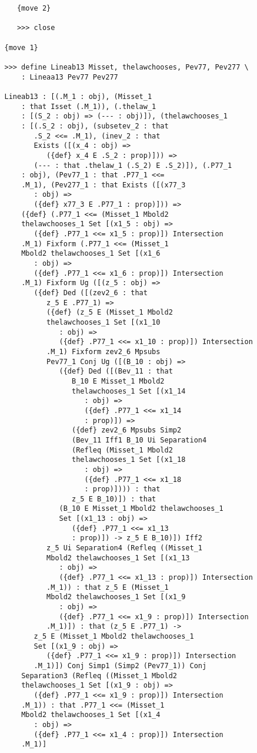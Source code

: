 \documentclass[12pt]{article}
\begin{document}
\begin{verbatim}
      {move 2}

      >>> close

   {move 1}

   >>> define Lineab13 Misset, thelawchooses, Pev77, Pev277 \
       : Lineaa13 Pev77 Pev277

   Lineab13 : [(.M_1 : obj), (Misset_1 
       : that Isset (.M_1)), (.thelaw_1 
       : [(S_2 : obj) => (--- : obj)]), (thelawchooses_1 
       : [(.S_2 : obj), (subsetev_2 : that 
          .S_2 <<= .M_1), (inev_2 : that 
          Exists ([(x_4 : obj) => 
             ({def} x_4 E .S_2 : prop)])) => 
          (--- : that .thelaw_1 (.S_2) E .S_2)]), (.P77_1 
       : obj), (Pev77_1 : that .P77_1 <<= 
       .M_1), (Pev277_1 : that Exists ([(x77_3 
          : obj) => 
          ({def} x77_3 E .P77_1 : prop)])) => 
       ({def} (.P77_1 <<= (Misset_1 Mbold2 
       thelawchooses_1 Set [(x1_5 : obj) => 
          ({def} .P77_1 <<= x1_5 : prop)]) Intersection 
       .M_1) Fixform (.P77_1 <<= (Misset_1 
       Mbold2 thelawchooses_1 Set [(x1_6 
          : obj) => 
          ({def} .P77_1 <<= x1_6 : prop)]) Intersection 
       .M_1) Fixform Ug ([(z_5 : obj) => 
          ({def} Ded ([(zev2_6 : that 
             z_5 E .P77_1) => 
             ({def} (z_5 E (Misset_1 Mbold2 
             thelawchooses_1 Set [(x1_10 
                : obj) => 
                ({def} .P77_1 <<= x1_10 : prop)]) Intersection 
             .M_1) Fixform zev2_6 Mpsubs 
             Pev77_1 Conj Ug ([(B_10 : obj) => 
                ({def} Ded ([(Bev_11 : that 
                   B_10 E Misset_1 Mbold2 
                   thelawchooses_1 Set [(x1_14 
                      : obj) => 
                      ({def} .P77_1 <<= x1_14 
                      : prop)]) => 
                   ({def} zev2_6 Mpsubs Simp2 
                   (Bev_11 Iff1 B_10 Ui Separation4 
                   (Refleq (Misset_1 Mbold2 
                   thelawchooses_1 Set [(x1_18 
                      : obj) => 
                      ({def} .P77_1 <<= x1_18 
                      : prop)]))) : that 
                   z_5 E B_10)]) : that 
                (B_10 E Misset_1 Mbold2 thelawchooses_1 
                Set [(x1_13 : obj) => 
                   ({def} .P77_1 <<= x1_13 
                   : prop)]) -> z_5 E B_10)]) Iff2 
             z_5 Ui Separation4 (Refleq ((Misset_1 
             Mbold2 thelawchooses_1 Set [(x1_13 
                : obj) => 
                ({def} .P77_1 <<= x1_13 : prop)]) Intersection 
             .M_1)) : that z_5 E (Misset_1 
             Mbold2 thelawchooses_1 Set [(x1_9 
                : obj) => 
                ({def} .P77_1 <<= x1_9 : prop)]) Intersection 
             .M_1)]) : that (z_5 E .P77_1) -> 
          z_5 E (Misset_1 Mbold2 thelawchooses_1 
          Set [(x1_9 : obj) => 
             ({def} .P77_1 <<= x1_9 : prop)]) Intersection 
          .M_1)]) Conj Simp1 (Simp2 (Pev77_1)) Conj 
       Separation3 (Refleq ((Misset_1 Mbold2 
       thelawchooses_1 Set [(x1_9 : obj) => 
          ({def} .P77_1 <<= x1_9 : prop)]) Intersection 
       .M_1)) : that .P77_1 <<= (Misset_1 
       Mbold2 thelawchooses_1 Set [(x1_4 
          : obj) => 
          ({def} .P77_1 <<= x1_4 : prop)]) Intersection 
       .M_1)]


\end{verbatim}
\end{document}
